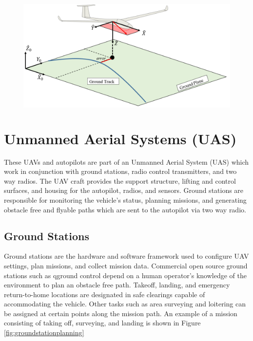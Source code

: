 \documentclass[numbered,pdftex]{ohio-etd}
\begin{document}
 \begin{figure}[H]
	\centering
	\includegraphics[width=12cm]{PaperFigures/UAVFrame}
	\caption{}
	\label{fig:uavframe}
\end{figure}


\section{Unmanned Aerial Systems (UAS)}
These UAVs and autopilots are part of an Unmanned Aerial System (UAS) which work in conjunction with ground stations, radio control transmitters, and two way radios. The UAV craft provides the support structure, lifting and control surfaces, and housing for the autopilot, radios, and sensors. Ground stations are responsible for monitoring the vehicle's status, planning missions, and generating obstacle free and flyable paths which are sent to the autopilot via two way radio.


\subsection{Ground Stations}
Ground stations are the hardware and software framework used to configure UAV settings, plan missions, and collect mission data. Commercial open source ground stations such as qground control depend on a human operator's knowledge of the environment to plan an obstacle free path. Takeoff, landing, and emergency return-to-home locations are designated in safe clearings capable of accommodating the vehicle. Other tasks such as area surveying and loitering can be assigned at certain points along the mission path. An example of a mission consisting of taking off, surveying, and landing is shown in Figure \ref{fig:groundstationplanning}
\end{document}

